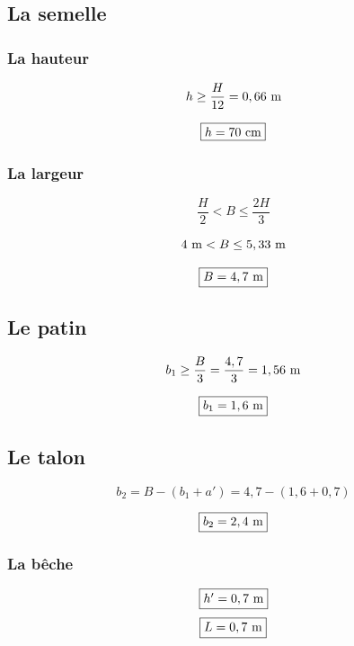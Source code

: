 \documentclass[12pt,a4paper]{article}
\begin{document}
	
	
	\subsection{La semelle}
	
	\subsubsection{La hauteur}
	
	\[ h \geq \dfrac{H}{12} = 0,66\meterl \]
	
	\[ \fbox{$h = 70\cml$} \]
	
	\subsubsection{La largeur}
	
	\[ \dfrac{H}{2} < B \leq \dfrac{2H}{3} \]
	
	\[ 4\meterl < B \leq 5,33\meterl \]
	
	\[ \fbox{$B = 4,7\meterl$} \]
	
	\subsection{Le patin}
	
	\[ b_{1} \geq \dfrac{B}{3} = \dfrac{4,7}{3} = 1,56\meterl \]
	
	\[ \fbox{$b_{1} = 1,6\meterl$} \]
	
	\subsection{Le talon}
	
	\[ b_{2} = B - (b_{1} + a') = 4,7 - (1,6 + 0,7) \]
	
	\[ \fbox{$b_{2} = 2,4\meterl$} \]
	
	\subsubsection{La bêche}
	
	\[ \fbox{$h' = 0,7\meterl$} \]
	\[ \fbox{$L = 0,7\meterl$} \]
	
	
	
\end{document}
